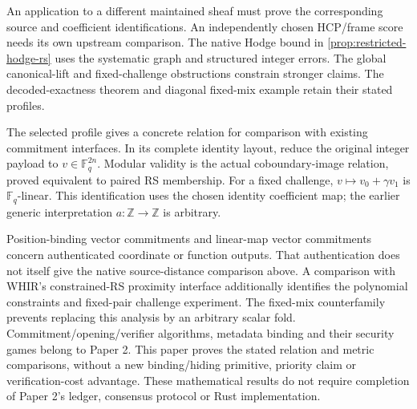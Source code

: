 An application to a different maintained sheaf must prove the corresponding
source and coefficient identifications. An independently chosen HCP/frame
score needs its own upstream comparison. The native Hodge bound in
\cref{prop:restricted-hodge-rs} uses the systematic graph and structured
integer errors. The global canonical-lift and fixed-challenge obstructions
constrain stronger claims. The decoded-exactness theorem and diagonal
fixed-mix example retain their stated profiles.

The selected profile gives a concrete relation for comparison with existing
commitment interfaces. In its complete identity layout, reduce the original
integer payload to \(v\in\mathbb F_q^{2n}\). Modular validity is the actual
coboundary-image relation, proved equivalent to paired RS membership. For a
fixed challenge, \(v\mapsto v_0+\gamma v_1\) is \(\mathbb F_q\)-linear.
This identification uses the chosen identity coefficient map; the earlier
generic interpretation \(a:\mathbb Z\to\mathbb Z\) is arbitrary.

Position-binding vector commitments \cite{catalanoFiore2011} and linear-map
vector commitments \cite{campanelliEtAl2022} concern authenticated coordinate
or function outputs. That authentication does not itself give the native
source-distance comparison above. A comparison with WHIR's constrained-RS
proximity interface \cite{arnonChiesaFenziYogev2024} additionally identifies
the polynomial constraints and fixed-pair challenge experiment. The fixed-mix
counterfamily prevents replacing this analysis by an arbitrary scalar fold.
Commitment/opening/verifier algorithms, metadata binding and their security
games belong to Paper 2. This paper proves the stated relation and metric
comparisons, without a new binding/hiding primitive, priority claim or
verification-cost advantage. These mathematical results do not require
completion of Paper 2's ledger, consensus protocol or Rust implementation.
